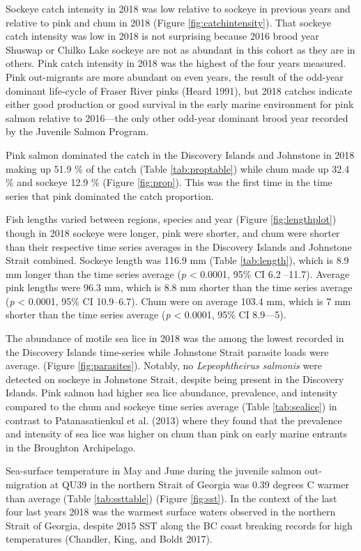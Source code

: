 \documentclass[fleqn,10pt]{wlpeerj} %
\begin{document}
Sockeye catch intensity in 2018 was low relative to sockeye in previous
years and relative to pink and chum in 2018 (Figure
\ref{fig:catchintensity}). That sockeye catch intensity was low in 2018
is not surprising because 2016 brood year Shuswap or Chilko Lake sockeye
are not as abundant in this cohort as they are in others. Pink catch
intensity in 2018 was the highest of the four years measured. Pink
out-migrants are more abundant on even years, the result of the odd-year
dominant life-cycle of Fraser River pinks (Heard 1991), but 2018 catches
indicate either good production or good survival in the early marine
environment for pink salmon relative to 2016---the only other odd-year
dominant brood year recorded by the Juvenile Salmon Program.

Pink salmon dominated the catch in the Discovery Islands and Johnstone
in 2018 making up 51.9 \% of the catch (Table \ref{tab:proptable}) while
chum made up 32.4 \% and sockeye 12.9 \% (Figure \ref{fig:prop}). This
was the first time in the time series that pink dominated the catch
proportion.

Fish lengths varied between regions, species and year (Figure
\ref{fig:lengthplot}) though in 2018 sockeye were longer, pink were
shorter, and chum were shorter than their respective time series
averages in the Discovery Islands and Johnstone Strait combined. Sockeye
length was 116.9 mm (Table \ref{tab:length}), which is 8.9 mm longer
than the time series average (\emph{p} \textless{} 0.0001, 95\% CI 6.2
--11.7). Average pink lengths were 96.3 mm, which is 8.8 mm shorter than
the time series average (\emph{p} \textless{} 0.0001, 95\% CI
10.9--6.7). Chum were on average 103.4 mm, which is 7 mm shorter than
the time series average (\emph{p} \textless{} 0.0001, 95\% CI 8.9---5).

The abundance of motile sea lice in 2018 was the among the lowest
recorded in the Discovery Islands time-series while Johnstone Strait
parasite loads were average. (Figure \ref{fig:parasites}). Notably, no
\emph{Lepeophtheirus salmonis} were detected on sockeye in Johnstone
Strait, despite being present in the Discovery Islands. Pink salmon had
higher sea lice abundance, prevalence, and intensity compared to the
chum and sockeye time series average (Table \ref{tab:sealice}) in
contrast to Patanasatienkul et al. (2013) where they found that the
prevalence and intensity of sea lice was higher on chum than pink on
early marine entrants in the Broughton Archipelago.

Sea-surface temperature in May and June during the juvenile salmon
out-migration at QU39 in the northern Strait of Georgia was 0.39 degrees
C warmer than average (Table \ref{tab:ssttable}) (Figure \ref{fig:sst}).
In the context of the last four last years 2018 was the warmest surface
waters observed in the northern Strait of Georgia, despite 2015 SST
along the BC coast breaking records for high temperatures (Chandler,
King, and Boldt 2017).
\end{document}
